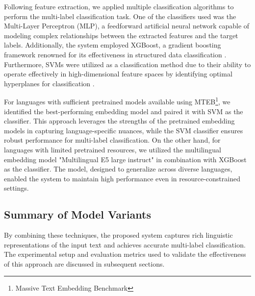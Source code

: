Following feature extraction, we applied multiple classification algorithms to perform the multi-label classification task. One of the classifiers used was the Multi-Layer Perceptron (MLP), a feedforward artificial neural network capable of modeling complex relationships between the extracted features and the target labels. Additionally, the system employed XGBoost, a gradient boosting framework renowned for its effectiveness in structured data classification \citep{chen2016xgboost}. Furthermore, SVMs were utilized as a classification method due to their ability to operate effectively in high-dimensional feature spaces by identifying optimal hyperplanes for classification \citep{cortes1995support}.

For languages with sufficient pretrained models available using MTEB\footnote{Massive Text Embedding Benchmark}\citep{muennighoff2022mteb}, we identified the best-performing embedding model and paired it with SVM as the classifier. This approach leverages the strengths of the pretrained embedding models in capturing language-specific nuances, while the SVM classifier ensures robust performance for multi-label classification. On the other hand, for languages with limited pretrained resources, we utilized the multilingual embedding model "Multilingual E5 large instruct" \citep{wang2024multilingual} in combination with XGBoost as the classifier. The model, designed to generalize across diverse languages, enabled the system to maintain high performance even in resource-constrained settings.

\subsection{Summary of Model Variants}

By combining these techniques, the proposed system captures rich linguistic representations of the input text and achieves accurate multi-label classification. The experimental setup and evaluation metrics used to validate the effectiveness of this approach are discussed in subsequent sections.